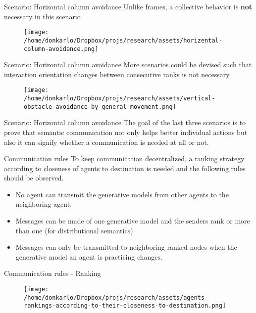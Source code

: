 \documentclass[unknownkeysallowed]{beamer}
\begin{document}
	\begin{frame}{Scenario: Horizontal column avoidance}
		Unlike frames, a collective behavior is \textbf{not} necessary in this scenario
		\begin{figure}
			\centering
			\texttt{[image: /home/donkarlo/Dropbox/projs/research/assets/horizental-column-avoidance.png]}
			\label{fig:vertical-obstacle-avoidance}
		\end{figure}
	\end{frame}

	\begin{frame}{Scenario: Horizontal column avoidance}
		More scenarios could be devised such that interaction orientation changes between consecutive ranks is not necessary
		\begin{figure}
			\centering
			\texttt{[image: /home/donkarlo/Dropbox/projs/research/assets/vertical-obstacle-avoidance-by-general-movement.png]}
			\label{fig:vertical-obstacle-avoidance}
		\end{figure} 
	\end{frame}

	\begin{frame}{Scenario: Horizontal column avoidance}
		The goal of the last three scenarios is to prove that semantic communication not only helps better individual actions but also it can signify whether a communication is needed at all or not.    
	\end{frame}

	\begin{frame}{Communication rules}
		To keep communication decentralized, a ranking strategy according to closeness of agents to destination is needed and the following rules should be observed. 
		\begin{itemize}
			\item No agent can transmit the generative models from other agents to the neighboring agent.
			\item Messages can be made of one generative model and the senders rank or more than one (for distributional semantics) 
			\item Messages can only be transmitted to neighboring ranked nodes when the generative model an agent is practicing changes.
		\end{itemize}
	\end{frame}

	\begin{frame}{Communication rules - Ranking}
		\begin{figure}
			\centering
			\texttt{[image: /home/donkarlo/Dropbox/projs/research/assets/agents-rankings-according-to-their-closeness-to-destination.png]}
			\label{fig:agents-rankings-according-to-their-closeness-to-destination.png}
		\end{figure}
	\end{frame}
\end{document}
